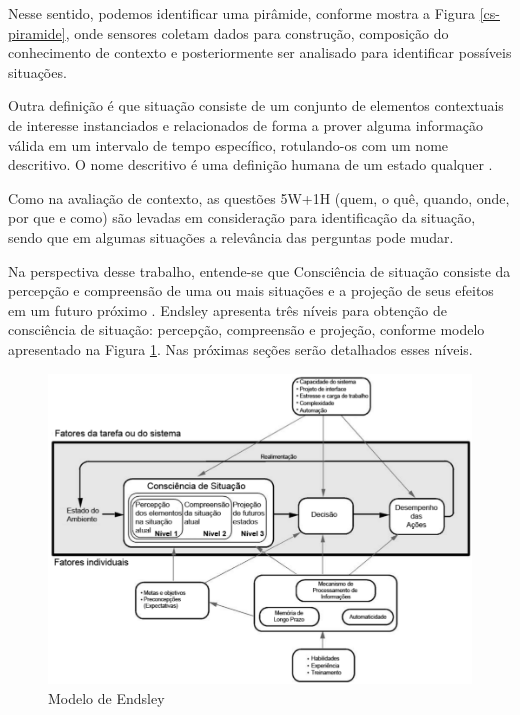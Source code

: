 \documentclass[12pt,a4paper,compsoc]{IEEEtran}
\begin{document}
  Nesse sentido, podemos identificar uma pirâmide, conforme mostra a Figura \ref{cs-piramide},
  onde sensores coletam dados para construção, composição do conhecimento de contexto e
  posteriormente ser analisado para identificar possíveis situações.

  Outra definição é que situação consiste de um conjunto de elementos contextuais de interesse 
  instanciados e relacionados de forma a prover alguma informação válida em um intervalo de tempo 
  específico, rotulando-os com um nome descritivo. O nome descritivo é uma definição humana de um 
  estado qualquer \cite{fleischmann2012}.
  
  Como na  avaliação de contexto, as questões 5W+1H (quem, o quê, quando, onde, por que e como) são
  levadas em consideração para identificação da situação, sendo que em algumas situações a 
  relevância das perguntas pode mudar.

  Na perspectiva desse trabalho, entende-se que Consciência de situação consiste da percepção e
  compreensão de uma ou mais situações e a projeção de seus efeitos em um futuro próximo 
  \cite{endsley1995}. Endsley apresenta três níveis para obtenção de consciência de situação:
  percepção, compreensão e projeção, conforme modelo apresentado na Figura \ref{modelo-endsley}.
  Nas próximas seções serão detalhados esses níveis.

  \begin{figure}[ht]
    \centerline{\includegraphics[scale=.35]{imagens/modelo-endsley.png}}
    \caption{Modelo de Endsley \cite{endsley1995}}
    \label{modelo-endsley}
  \end{figure}
\end{document}
